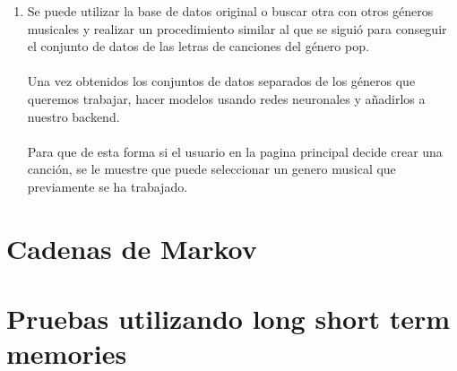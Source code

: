 \documentclass[12pt, a4paper, titlepage]{report}
\begin{document}
\begin{enumerate}
\item Se puede utilizar la base de datos original o buscar otra con otros géneros musicales y realizar un procedimiento similar al que se siguió para conseguir el conjunto de datos de las letras de canciones del género pop.\\\\
Una vez obtenidos los conjuntos de datos separados de los géneros que queremos trabajar, hacer modelos usando redes neuronales y añadirlos a nuestro backend.\\\\
Para que de esta forma si el usuario en la pagina principal decide crear una canción, se le muestre que puede seleccionar un genero musical que previamente se ha trabajado.
\end{enumerate}

\renewcommand*\appendixpagename{{\textcolor{azulescom}{Anexos}}}
\renewcommand*\appendixtocname{{\textcolor{azulescom}{Anexos}}}
\pagebreak
\appendixpageon
	\begin{appendices}
	\centering
	\section{Cadenas de Markov}
	\label{prueba2}
	\newpage
		\section{Pruebas utilizando long short term memories}
		\label{pruebaslstm}
	\newpage
	\renewcommand*\glossaryname{{\textcolor{azulescom}{Glosario}}}
	\printglossary
	\newpage
	\renewcommand*\glossaryname{{\textcolor{azulescom}{Acrónimos}}}
	\printglossary[title={\textcolor{azulescom}{Acrónimos.}}, type=\acronymtype]
\end{appendices}
\end{document}
